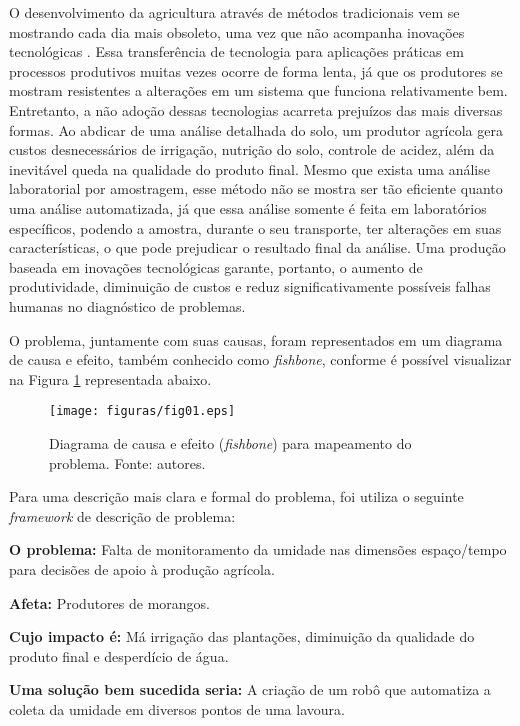   O desenvolvimento da agricultura através de métodos tradicionais vem se
  mostrando cada dia mais obsoleto, uma vez que não acompanha inovações
  tecnológicas \cite{ROCHA2015}. Essa transferência de tecnologia para aplicações
  práticas em processos produtivos muitas vezes ocorre de forma lenta, já que
  os produtores se mostram resistentes a alterações em um sistema que funciona
  relativamente bem. Entretanto, a não adoção dessas tecnologias acarreta
  prejuízos das mais diversas formas. Ao abdicar de uma análise detalhada do
  solo, um produtor agrícola gera custos desnecessários de irrigação, nutrição
  do solo, controle de acidez, além da inevitável queda na qualidade do produto
  final. Mesmo que exista uma análise laboratorial por amostragem, esse método
  não se mostra ser tão eficiente quanto uma análise automatizada, já que essa
  análise somente é feita em laboratórios específicos, podendo a amostra,
  durante o seu transporte, ter alterações em suas características, o que pode
  prejudicar o resultado final da análise. Uma produção baseada em inovações
  tecnológicas garante, portanto, o aumento de produtividade, diminuição de
  custos e reduz significativamente possíveis falhas humanas no diagnóstico de
  problemas.


  O problema, juntamente com suas causas, foram representados em um diagrama
  de causa e efeito, também conhecido como \textit{fishbone}, conforme é possível visualizar
  na Figura \ref{fig01} representada abaixo.

  \begin{figure}[h]
    \centering
    \texttt{[image: figuras/fig01.eps]}
    \caption{Diagrama de causa e efeito (\textit{fishbone}) para mapeamento do problema. Fonte: autores.}
    \label{fig01}
  \end{figure}

  Para uma descrição mais clara e formal do problema, foi utiliza o seguinte
  \textit{framework} de descrição de problema:

  \textbf{O problema:} Falta de monitoramento da umidade nas dimensões espaço/tempo
  para decisões de apoio à produção agrícola.

  \textbf{Afeta:} Produtores de morangos.

  \textbf{Cujo impacto é:} Má irrigação das plantações, diminuição da qualidade
  do produto final e desperdício de água.

  \textbf{Uma solução bem sucedida seria:} A criação de um robô que automatiza
  a coleta da umidade em diversos pontos de uma lavoura.

